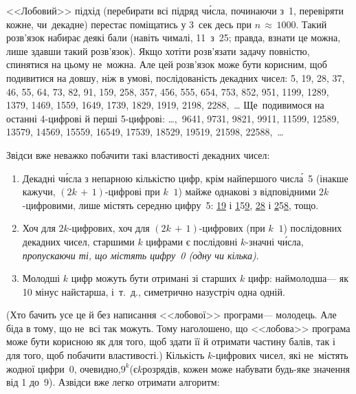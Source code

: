 \Tutorial	<<Лобовий>> підхід (перебирати всі підряд ч\'{и}сла, починаючи з~1, перевіряти кожне, чи~декадне) перестає поміщатись у 3~сек десь при ${n\,{\approx}\,1000}$. Такий розв'язок набирає деякі бали (навіть чималі, 11~з~25; правда, взнати це можна, лише здавши такий розв'язок). Якщо хотіти розв'язати задачу повністю, спинятися на цьому не~можна. Але цей розв'язок може бути корисним, щоб подивитися на довшу, ніж в умові, послідованість декадних чисел: 
5, 19, 28, 37, 46, 55, 64, 73, 82, 91, 159, 258, 357, 456, 555, 654, 753, 852, 951, 1199, 1289, 1379, 1469, 1559, 1649, 1739, 1829, 1919, 2198, 2288,~\dots{} Ще~подивимося на останні 4-цифрові й перші 5-цифрові: \dots,~9641, 9731, 9821, 9911, 11599, 12589, 13579, 14569, 15559, 16549, 17539, 18529, 19519, 21598, 22588,~\dots{}

Звідси вже неважко побачити такі властивості декадних чисел:
\begin{enumerate}
\item
Декадні ч\'{и}сла з непарною кількістю цифр, крім найпершого числ\'{а}~5 (інакше кажучи, ${(2k\,{+}\,1)}$-цифрові при ${k\,{\>}\,1}$) майже однакові з відповідними $2k$-цифровими, лише містять середню цифру~5:
\underline{1}\underline{\underline{9}} і \underline{1}5\underline{\underline{9}},
\underline{2}\underline{\underline{8}} і \underline{2}5\underline{\underline{8}},
тощо.
\item
Хоч для $2k$-цифрових, хоч для ${(2k\,{+}\,1)}$-цифрових (при ${k\,{\>}\,1}$) послідовних декадних чисел, старшими $k$ цифрами є послідовні $k$-значні ч\'{и}сла, \emph{пропускаючи ті, що містять цифру~0 (одну чи кілька)}.
\item
Молодші $k$ цифр можуть бути отримані зі старших $k$ цифр: наймолодша\nolinebreak[3] --- як 10 мінус найстарша, і~т.~д., симетрично назустріч одна одній.
\end{enumerate}

(Хто бачить усе це й без написання <<лобової>> програми\nolinebreak[3] --- молодець. Але біда в тому, що не~всі так можуть. Тому наголошено, що <<лобова>> програма може бути корисною як для того, щоб здати її й отримати частину балів, так і для того, щоб побачити властивості.) Кількість $k$-цифрових чисел, які не~містять жодної цифри~0, очевидно,\nolinebreak[3] $9^k$\linebreak[2] (є\nolinebreak[3] $k$\nolinebreak[2] розрядів, кожен може набувати будь-яке значення від 1 до~9). А\nolinebreak[3] звідси вже легко отримати алгоритм:

